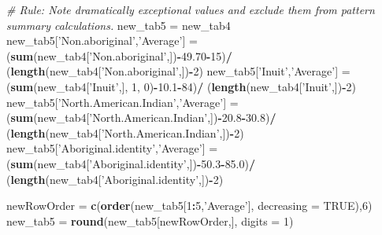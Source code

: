 \documentclass[9pt,letter]{article}
\newenvironment{Shaded}{\begin{snugshade}}{\end{snugshade}}
\newcommand{\KeywordTok}[1]{\textcolor[rgb]{0.13,0.29,0.53}{\textbf{#1}}}
\newcommand{\DataTypeTok}[1]{\textcolor[rgb]{0.13,0.29,0.53}{#1}}
\newcommand{\DecValTok}[1]{\textcolor[rgb]{0.00,0.00,0.81}{#1}}
\newcommand{\FloatTok}[1]{\textcolor[rgb]{0.00,0.00,0.81}{#1}}
\newcommand{\StringTok}[1]{\textcolor[rgb]{0.31,0.60,0.02}{#1}}
\newcommand{\CommentTok}[1]{\textcolor[rgb]{0.56,0.35,0.01}{\textit{#1}}}
\newcommand{\OtherTok}[1]{\textcolor[rgb]{0.56,0.35,0.01}{#1}}
\newcommand{\OperatorTok}[1]{\textcolor[rgb]{0.81,0.36,0.00}{\textbf{#1}}}
\newcommand{\NormalTok}[1]{#1}
\begin{document}
\begin{Shaded}
\begin{Highlighting}[]
\CommentTok{# Rule: Note dramatically exceptional values and exclude them from pattern summary calculations.}
\NormalTok{new_tab5 =}\StringTok{ }\NormalTok{new_tab4}
\NormalTok{new_tab5[}\StringTok{'Non.aboriginal'}\NormalTok{,}\StringTok{'Average'}\NormalTok{] =}\StringTok{ }\NormalTok{(}\KeywordTok{sum}\NormalTok{(new_tab4[}\StringTok{'Non.aboriginal'}\NormalTok{,])}\OperatorTok{-}\FloatTok{49.70}\OperatorTok{-}\DecValTok{15}\NormalTok{)}\OperatorTok{/}
\StringTok{  }\NormalTok{(}\KeywordTok{length}\NormalTok{(new_tab4[}\StringTok{'Non.aboriginal'}\NormalTok{,])}\OperatorTok{-}\DecValTok{2}\NormalTok{)}
\NormalTok{new_tab5[}\StringTok{'Inuit'}\NormalTok{,}\StringTok{'Average'}\NormalTok{] =}\StringTok{ }\NormalTok{(}\KeywordTok{sum}\NormalTok{(new_tab4[}\StringTok{'Inuit'}\NormalTok{,], }\DecValTok{1}\NormalTok{, }\DecValTok{0}\NormalTok{)}\OperatorTok{-}\FloatTok{10.1}\OperatorTok{-}\DecValTok{84}\NormalTok{)}\OperatorTok{/}
\StringTok{  }\NormalTok{(}\KeywordTok{length}\NormalTok{(new_tab4[}\StringTok{'Inuit'}\NormalTok{,])}\OperatorTok{-}\DecValTok{2}\NormalTok{)}
\NormalTok{new_tab5[}\StringTok{'North.American.Indian'}\NormalTok{,}\StringTok{'Average'}\NormalTok{] =}\StringTok{ }\NormalTok{(}\KeywordTok{sum}\NormalTok{(new_tab4[}\StringTok{'North.American.Indian'}\NormalTok{,])}\OperatorTok{-}\FloatTok{20.8}\OperatorTok{-}\FloatTok{30.8}\NormalTok{)}\OperatorTok{/}
\StringTok{  }\NormalTok{(}\KeywordTok{length}\NormalTok{(new_tab4[}\StringTok{'North.American.Indian'}\NormalTok{,])}\OperatorTok{-}\DecValTok{2}\NormalTok{)}
\NormalTok{new_tab5[}\StringTok{'Aboriginal.identity'}\NormalTok{,}\StringTok{'Average'}\NormalTok{] =}\StringTok{ }\NormalTok{(}\KeywordTok{sum}\NormalTok{(new_tab4[}\StringTok{'Aboriginal.identity'}\NormalTok{,])}\OperatorTok{-}\FloatTok{50.3}\OperatorTok{-}\FloatTok{85.0}\NormalTok{)}\OperatorTok{/}
\StringTok{  }\NormalTok{(}\KeywordTok{length}\NormalTok{(new_tab4[}\StringTok{'Aboriginal.identity'}\NormalTok{,])}\OperatorTok{-}\DecValTok{2}\NormalTok{)}

\NormalTok{newRowOrder =}\StringTok{ }\KeywordTok{c}\NormalTok{(}\KeywordTok{order}\NormalTok{(new_tab5[}\DecValTok{1}\OperatorTok{:}\DecValTok{5}\NormalTok{,}\StringTok{'Average'}\NormalTok{], }\DataTypeTok{decreasing =} \OtherTok{TRUE}\NormalTok{),}\DecValTok{6}\NormalTok{)}
\NormalTok{new_tab5 =}\StringTok{ }\KeywordTok{round}\NormalTok{(new_tab5[newRowOrder,], }\DataTypeTok{digits =} \DecValTok{1}\NormalTok{)}


\end{Highlighting}
\end{Shaded}
\end{document}

